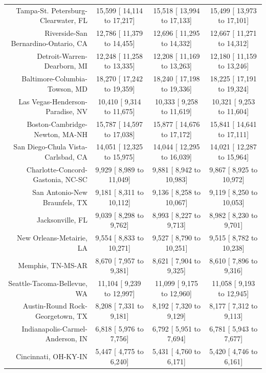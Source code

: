 \documentclass{article}
\begin{document}
\begin{table}[H]
\begin{tabular}{|r|c|c|c|}
		Tampa-St. Petersburg-Clearwater, FL &  15,599 [ 14,114 to  17,217] &  15,518 [ 13,994 to  17,133] &  15,499 [ 13,973 to  17,101]\\
		Riverside-San Bernardino-Ontario, CA &  12,786 [ 11,379 to  14,455] &  12,696 [ 11,295 to  14,332] &  12,667 [ 11,271 to  14,312]\\
		Detroit-Warren-Dearborn, MI &  12,248 [ 11,258 to  13,335] &  12,208 [ 11,169 to  13,263] &  12,180 [ 11,159 to  13,246]\\
		Baltimore-Columbia-Towson, MD &  18,270 [ 17,242 to  19,359] &  18,240 [ 17,198 to  19,336] &  18,225 [ 17,191 to  19,324]\\
		Las Vegas-Henderson-Paradise, NV &  10,410 [  9,314 to  11,675] &  10,333 [  9,258 to  11,619] &  10,321 [  9,253 to  11,604]\\
		Boston-Cambridge-Newton, MA-NH &  15,787 [ 14,597 to  17,038] &  15,877 [ 14,676 to  17,172] &  15,841 [ 14,641 to  17,111]\\
		San Diego-Chula Vista-Carlsbad, CA &  14,051 [ 12,325 to  15,975] &  14,044 [ 12,295 to  16,039] &  14,021 [ 12,287 to  15,964]\\
		Charlotte-Concord-Gastonia, NC-SC &   9,929 [  8,989 to  11,049] &   9,881 [  8,942 to  10,983] &   9,867 [  8,925 to  10,972]\\
		San Antonio-New Braunfels, TX &   9,181 [  8,311 to  10,112] &   9,136 [  8,258 to  10,067] &   9,119 [  8,250 to  10,053]\\
		Jacksonville, FL &   9,039 [  8,298 to   9,762] &   8,993 [  8,227 to   9,713] &   8,982 [  8,230 to   9,701]\\
		New Orleans-Metairie, LA &   9,554 [  8,833 to  10,271] &   9,527 [  8,790 to  10,251] &   9,515 [  8,782 to  10,238]\\
		Memphis, TN-MS-AR &   8,670 [  7,957 to   9,381] &   8,621 [  7,904 to   9,325] &   8,610 [  7,896 to   9,316]\\
		Seattle-Tacoma-Bellevue, WA &  11,104 [  9,239 to  12,997] &  11,099 [  9,175 to  12,960] &  11,058 [  9,193 to  12,945]\\
		Austin-Round Rock-Georgetown, TX &   8,208 [  7,331 to   9,181] &   8,192 [  7,320 to   9,129] &   8,177 [  7,312 to   9,113]\\
		Indianapolis-Carmel-Anderson, IN &   6,818 [  5,976 to   7,756] &   6,792 [  5,951 to   7,694] &   6,781 [  5,943 to   7,677]\\
		Cincinnati, OH-KY-IN &   5,447 [  4,775 to   6,240] &   5,431 [  4,760 to   6,171] &   5,420 [  4,746 to   6,161]\\

\end{tabular}
\end{table}
\end{document}
